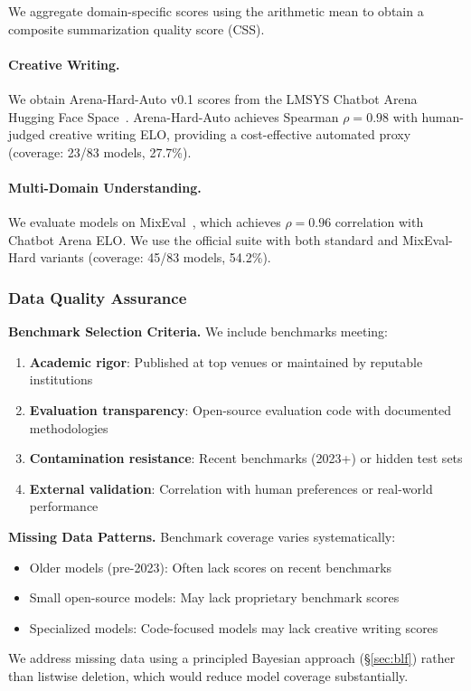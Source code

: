 \noindent We aggregate domain-specific scores using the arithmetic mean to obtain a composite summarization quality score (CSS).

\paragraph{Creative Writing.}
We obtain Arena-Hard-Auto v0.1 scores from the LMSYS Chatbot Arena Hugging Face Space~\cite{zheng2023arena}. Arena-Hard-Auto achieves Spearman $\rho = 0.98$ with human-judged creative writing ELO, providing a cost-effective automated proxy (coverage: 23/83 models, 27.7\%).

\paragraph{Multi-Domain Understanding.}
We evaluate models on MixEval~\cite{ni2024mixeval}, which achieves $\rho = 0.96$ correlation with Chatbot Arena ELO. We use the official suite with both standard and MixEval-Hard variants (coverage: 45/83 models, 54.2\%).

\subsubsection{Data Quality Assurance}

\textbf{Benchmark Selection Criteria.} We include benchmarks meeting:
%
\begin{enumerate}[nosep]
\item \textbf{Academic rigor}: Published at top venues or maintained by reputable institutions
\item \textbf{Evaluation transparency}: Open-source evaluation code with documented methodologies
\item \textbf{Contamination resistance}: Recent benchmarks (2023+) or hidden test sets
\item \textbf{External validation}: Correlation with human preferences or real-world performance
\end{enumerate}

\textbf{Missing Data Patterns.} Benchmark coverage varies systematically:
%
\begin{itemize}[nosep]
\item Older models (pre-2023): Often lack scores on recent benchmarks
\item Small open-source models: May lack proprietary benchmark scores
\item Specialized models: Code-focused models may lack creative writing scores
\end{itemize}
%
We address missing data using a principled Bayesian approach (§\ref{sec:blf}) rather than listwise deletion, which would reduce model coverage substantially.

